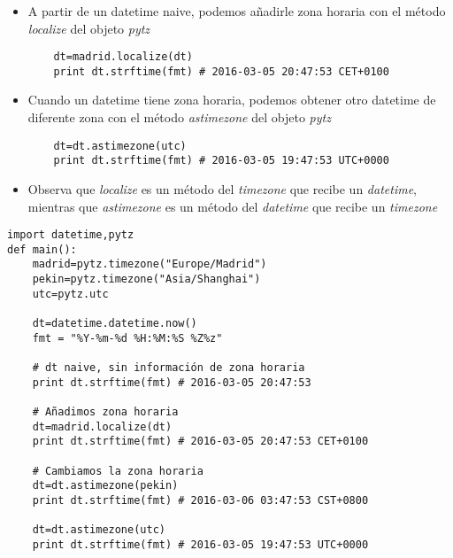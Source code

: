 \documentclass[ucs]{beamer}
\begin{document}
\begin{frame}[fragile]
\frametitle{}
\begin{itemize}


\item
A partir de un datetime naive, podemos añadirle zona horaria con el método 
\emph{localize}
del objeto
\emph{pytz}

  \begin{footnotesize}
  \begin{verbatim}
    dt=madrid.localize(dt)
    print dt.strftime(fmt) # 2016-03-05 20:47:53 CET+0100
  \end{verbatim}
  \end{footnotesize}

\item
Cuando un datetime tiene zona horaria, podemos obtener otro datetime de diferente zona con el método
\emph{astimezone}
del objeto
\emph{pytz}

  \begin{footnotesize}
  \begin{verbatim}
    dt=dt.astimezone(utc)
    print dt.strftime(fmt) # 2016-03-05 19:47:53 UTC+0000
  \end{verbatim}
  \end{footnotesize}

\item
Observa que 
\emph{localize} es un método del 
\emph{timezone} 
que recibe un 
\emph{datetime}, 
mientras que 
\emph{astimezone} es un método del 
\emph{datetime}
que recibe un 
\emph{timezone} 


\end{itemize}

\end{frame}


\begin{frame}[fragile]

  \begin{footnotesize}
  \begin{verbatim}
import datetime,pytz
def main():
    madrid=pytz.timezone("Europe/Madrid")
    pekin=pytz.timezone("Asia/Shanghai")
    utc=pytz.utc

    dt=datetime.datetime.now()
    fmt = "%Y-%m-%d %H:%M:%S %Z%z"

    # dt naive, sin información de zona horaria
    print dt.strftime(fmt) # 2016-03-05 20:47:53

    # Añadimos zona horaria
    dt=madrid.localize(dt)
    print dt.strftime(fmt) # 2016-03-05 20:47:53 CET+0100

    # Cambiamos la zona horaria
    dt=dt.astimezone(pekin)
    print dt.strftime(fmt) # 2016-03-06 03:47:53 CST+0800

    dt=dt.astimezone(utc)
    print dt.strftime(fmt) # 2016-03-05 19:47:53 UTC+0000

  \end{verbatim}
  \end{footnotesize}

\end{frame}
\end{document}
